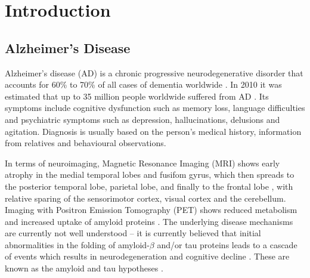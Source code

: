 \chapter{Introduction}
\label{chapter:intro}

\section{Alzheimer's Disease}

Alzheimer's disease (AD) is a chronic progressive neurodegenerative disorder that accounts for 60\% to 70\% of all cases of dementia worldwide \cite{Burns2009,world2013dementia}. In 2010 it was estimated that up to 35 million people worldwide suffered from AD \cite{world2013dementia}. Its symptoms include cognitive dysfunction such as memory loss, language difficulties and psychiatric symptoms such as depression, hallucinations, delusions and agitation. Diagnosis is usually based on the person's medical history, information from relatives and behavioural observations.

In terms of neuroimaging, Magnetic Resonance Imaging (MRI) shows early atrophy in the medial temporal lobes and fusifom gyrus, which then spreads to the posterior temporal lobe, parietal lobe, and finally to the frontal lobe \cite{whitwell2010progression}, with relative sparing of the sensorimotor cortex, visual cortex and the cerebellum. Imaging with Positron Emission Tomography (PET) shows reduced metabolism and increased uptake of amyloid proteins \cite{marcus2014brain}. The underlying disease mechanisms are currently not well understood -- it is currently believed that initial abnormalities in the folding of amyloid-$\beta$ and/or tau proteins leads to a cascade of events which results in neurodegeneration and cognitive decline \cite{mudher2002alzheimer}. These are known as the amyloid and tau hypotheses \cite{mudher2002alzheimer}.


